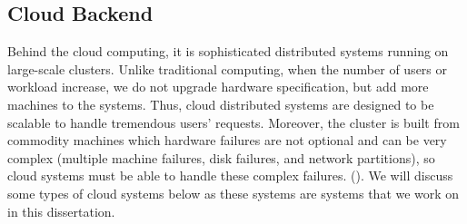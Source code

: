 \subsection{Cloud Backend}

Behind the cloud computing, it is sophisticated distributed systems running on
large-scale clusters. Unlike traditional computing, when the number of users or
workload increase, we do not upgrade hardware specification, but add more
machines to the systems. Thus, cloud distributed systems are designed to be
scalable to handle tremendous users' requests. Moreover, the cluster is built
from commodity machines which hardware failures are not optional and can be very
complex (\eg multiple machine failures, disk failures, and network partitions),
so cloud systems must be able to handle these complex failures. (). We will discuss some types of cloud systems below as these systems are
systems that we work on in this dissertation.

